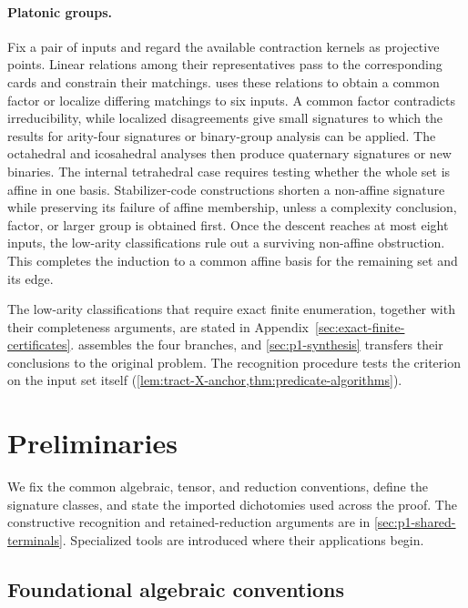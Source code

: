 \documentclass[11pt,letterpaper,onecolumn]{article}
\theoremstyle{plain}
\theoremstyle{definition}
\theoremstyle{remark}
\begin{document}
\paragraph{Platonic groups.}
Fix a pair of inputs and regard the available contraction kernels as
projective points. Linear relations among their representatives pass to
the corresponding cards and constrain their matchings. 
uses these relations to obtain a common factor or localize differing
matchings to six inputs. A common factor contradicts irreducibility,
while localized disagreements give small signatures to which the
results for arity-four signatures or binary-group analysis can be applied.  The
octahedral and icosahedral analyses
then produce quaternary signatures or new binaries. The internal
tetrahedral case requires testing whether the whole set is affine
in one basis.  Stabilizer-code constructions shorten a non-affine
signature while preserving its failure of affine membership, unless
a complexity conclusion, factor, or larger group is obtained first.
Once the descent reaches at most eight inputs, the low-arity
classifications rule out a surviving non-affine obstruction.  This
completes the induction to a common affine basis for the remaining
set and its edge.

The low-arity classifications that require exact finite enumeration,
together with their completeness arguments, are stated in
Appendix~\ref{sec:exact-finite-certificates}. 
assembles the four branches, and \cref{sec:p1-synthesis} transfers their
conclusions to the original problem. The recognition procedure tests the criterion
on the input set itself (\cref{lem:tract-X-anchor,thm:predicate-algorithms}).
\section{Preliminaries}
\label{sec:preliminaries}

We fix the common algebraic, tensor, and reduction conventions, define the
signature classes, and state the imported dichotomies used across the proof.
The constructive recognition and retained-reduction arguments are in
\cref{sec:p1-shared-terminals}.  Specialized tools are introduced where
their applications begin.

\subsection{Foundational algebraic conventions}
\label{subsec:foundational-algebra}
\end{document}
